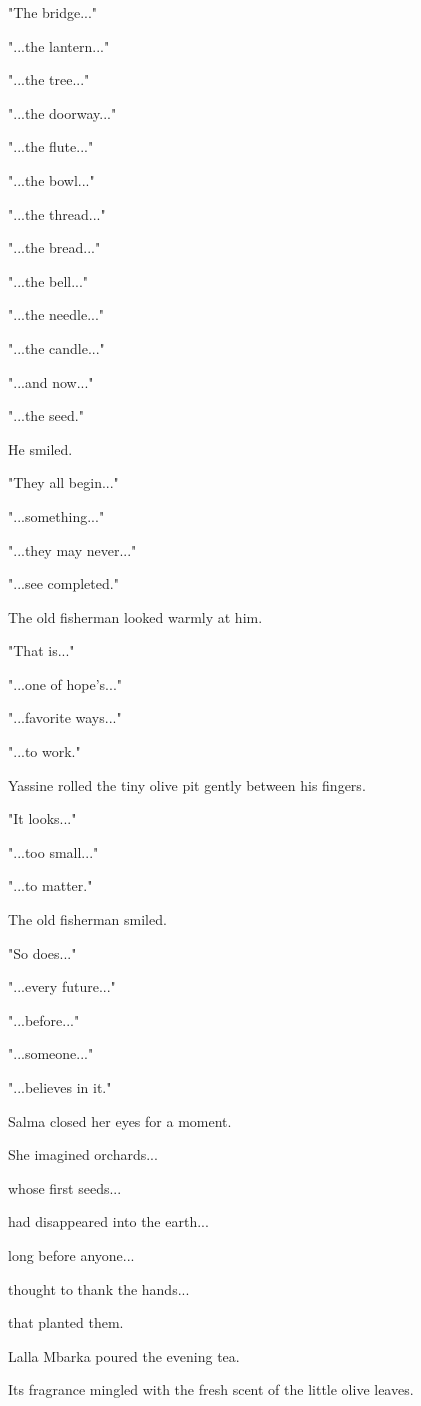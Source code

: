 \documentclass[12pt,openany]{book}
\begin{document}
"The bridge..."

"...the lantern..."

"...the tree..."

"...the doorway..."

"...the flute..."

"...the bowl..."

"...the thread..."

"...the bread..."

"...the bell..."

"...the needle..."

"...the candle..."

"...and now..."

"...the seed."

He smiled.

"They all begin..."

"...something..."

"...they may never..."

"...see completed."

The old fisherman looked warmly at him.

"That is..."

"...one of hope's..."

"...favorite ways..."

"...to work."

Yassine rolled the tiny olive pit gently between his fingers.

"It looks..."

"...too small..."

"...to matter."

The old fisherman smiled.

"So does..."

"...every future..."

"...before..."

"...someone..."

"...believes in it."

Salma closed her eyes for a moment.

She imagined orchards...

whose first seeds...

had disappeared into the earth...

long before anyone...

thought to thank the hands...

that planted them.

Lalla Mbarka poured the evening tea.

Its fragrance mingled with the fresh scent of the little olive leaves.
\end{document}
